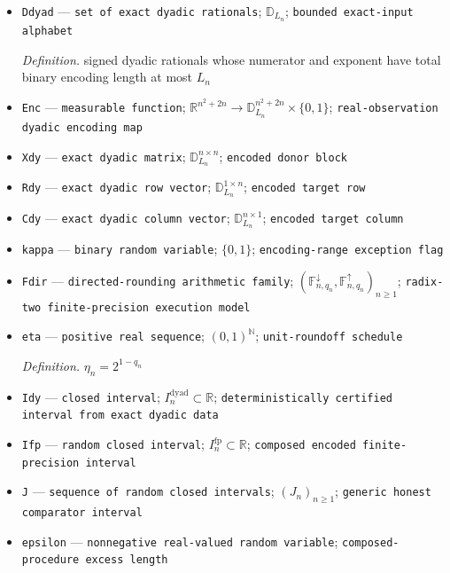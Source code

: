 \documentclass{article}
\begin{document}
\begin{itemize}
  \par\smallskip\noindent\emph{Definition.} \(T_n^{\mathrm{enc}}=2^{L_n-p_n-\lceil\log_2(p_n+2)\rceil-4}\)
  \item \texttt{Ddyad} --- \texttt{set of exact dyadic rationals}; \(\mathbb D_{L_n}\); \texttt{bounded exact-\allowbreak{}input alphabet}
  \par\smallskip\noindent\emph{Definition.} signed dyadic rationals whose numerator and exponent have total binary encoding length at most \(L_n\)
  \item \texttt{Enc} --- \texttt{measurable function}; \(\mathbb R^{n^2+2n}\to\mathbb D_{L_n}^{n^2+2n}\times\{0,1\}\); \texttt{real-\allowbreak{}observation dyadic encoding map}
  \item \texttt{Xdy} --- \texttt{exact dyadic matrix}; \(\mathbb D_{L_n}^{n\times n}\); \texttt{encoded donor block}
  \item \texttt{Rdy} --- \texttt{exact dyadic row vector}; \(\mathbb D_{L_n}^{1\times n}\); \texttt{encoded target row}
  \item \texttt{Cdy} --- \texttt{exact dyadic column vector}; \(\mathbb D_{L_n}^{n\times1}\); \texttt{encoded target column}
  \item \texttt{kappa} --- \texttt{binary random variable}; \(\{0,1\}\); \texttt{encoding-\allowbreak{}range exception flag}
  \item \texttt{Fdir} --- \texttt{directed-\allowbreak{}rounding arithmetic family}; \((\mathbb F_{n,q_n}^{\downarrow},\mathbb F_{n,q_n}^{\uparrow})_{n\ge1}\); \texttt{radix-\allowbreak{}two finite-\allowbreak{}precision execution model}
  \item \texttt{eta} --- \texttt{positive real sequence}; \((0,1)^{\mathbb N}\); \texttt{unit-\allowbreak{}roundoff schedule}
  \par\smallskip\noindent\emph{Definition.} \(\eta_n=2^{1-q_n}\)
  \item \texttt{Idy} --- \texttt{closed interval}; \(I_n^{\mathrm{dyad}}\subset\mathbb R\); \texttt{deterministically certified interval from exact dyadic data}
  \item \texttt{Ifp} --- \texttt{random closed interval}; \(I_n^{\mathrm{fp}}\subset\mathbb R\); \texttt{composed encoded finite-\allowbreak{}precision interval}
  \item \texttt{J} --- \texttt{sequence of random closed intervals}; \((J_n)_{n\ge1}\); \texttt{generic honest comparator interval}
  \item \texttt{epsilon} --- \texttt{nonnegative real-\allowbreak{}valued random variable}; \texttt{composed-\allowbreak{}procedure excess length}

\end{itemize}
\end{document}
